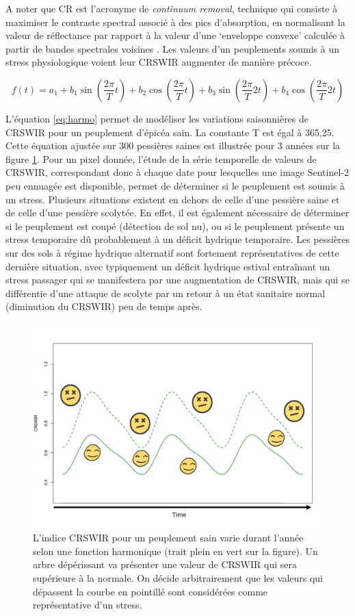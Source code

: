 \documentclass[a4paper, 12pt]{article} %
\begin{document}
A noter que CR est l'acronyme de \textit{continuum removal}, technique qui consiste à maximiser le contraste spectral associé à des pics d’absorption, en normalisant la valeur de réflectance
par rapport à la valeur d’une ‘enveloppe convexe’ calculée à partir de bandes spectrales voisines \citep{dutrieux_mise_2021}.
Les valeurs d'un peuplements soumis à un stress physiologique voient leur CRSWIR augmenter de manière précoce.

\begin{equation}\label{eq:harmo}
 f(t) =   a_{1} + b_{1} \sin(\dfrac{2\pi}{T}t)+ b_{2} \cos(\dfrac{2\pi}{T}t)+ b_{3} \sin(\dfrac{2\pi}{T}2t)+ b_{4} \cos(\dfrac{2\pi}{T}2t)
\end{equation} 

L'équation \ref{eq:harmo} permet de modéliser les variations saisonnières de CRSWIR pour un peuplement d'épicéa sain. La constante T est égal à 365,25. Cette équation ajustée sur 300 pessières saines est illustrée pour 3 années sur la figure \ref{fig:harmo}. Pour un pixel donnée, l'étude de la série temporelle de valeurs de CRSWIR, correspondant donc à chaque date pour lesquelles une image Sentinel-2 peu ennuagée est disponible, permet de déterminer si le peuplement est soumis à un stress. Plusieurs situations existent en dehors de celle d'une pessière saine et de celle d'une pessière scolytée. En effet, il est également nécessaire de déterminer si le peuplement est coupé (détection de sol nu), ou si le peuplement présente un stress temporaire dû probablement à un déficit hydrique temporaire. Les pessières sur des sols à régime hydrique alternatif sont fortement représentatives de cette dernière situation, avec typiquement un déficit hydrique estival entraînant un stress passager qui se manifestera par une augmentation de CRSWIR, mais qui se différentie d'une attaque de scolyte par un retour à un état sanitaire normal (diminution du CRSWIR) peu de temps après.

\begin{figure}[H]
	\centering
	\includegraphics[width=0.9\linewidth]{fctHarmo.png}
	\caption{L'indice CRSWIR pour un peuplement sain varie durant l'année selon une fonction harmonique (trait plein en vert sur la figure). Un arbre dépérissant va présenter une valeur de CRSWIR qui sera supérieure à la normale. On décide arbitrairement que les valeurs qui dépassent la courbe en pointillé sont considérées comme représentative d'un stress. }
	\label{fig:harmo}
\end{figure}
\end{document}
